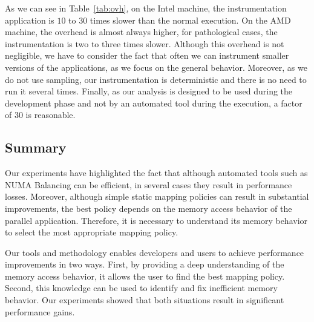 As we can see in Table~\ref{tab:ovh}, on the Intel machine,
the instrumentation application is $10$ to $30$ times slower than the normal
execution. On the AMD machine, the overhead is almost always higher, for
pathological cases, the instrumentation is two to three times slower.
Although this overhead is not negligible, we have to consider the fact that often we can instrument
smaller versions of the applications, as we focus on the general behavior.
Moreover, as we do not use sampling, our instrumentation is deterministic and
there is no need to run it several times. Finally, as our
analysis is designed to be used during the development phase and not by an
automated tool during the execution, a factor of $30$ is reasonable.

\subsection{Summary}

Our experiments have highlighted the fact that although automated tools such
as NUMA Balancing can be efficient, in several cases they result in
performance losses. Moreover, although simple static mapping policies
can result in substantial improvements, the best policy depends on the memory access behavior of the parallel application. Therefore, it is necessary to understand its memory behavior to
select the most appropriate mapping policy.

Our tools and methodology enables developers and users to achieve performance improvements in two ways. First, by
providing a deep understanding of the memory access behavior, it allows the user to
find the best mapping policy. Second, this knowledge can be used to
identify and fix inefficient memory behavior. Our experiments showed that both
situations result in significant performance gains.
